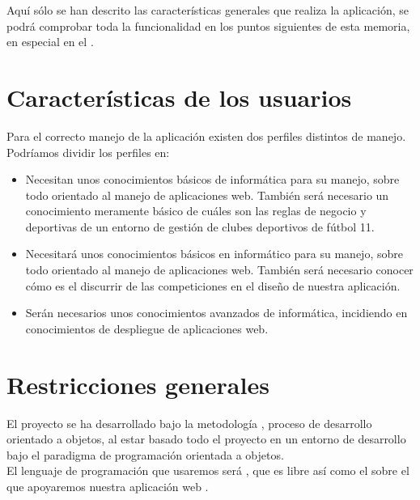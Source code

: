 Aquí sólo se han descrito las características generales que realiza la
aplicación, se podrá comprobar toda la funcionalidad en los puntos siguientes de
esta memoria, en especial en el .

\section{Características de los usuarios}

Para el correcto manejo de la aplicación  existen dos perfiles distintos de manejo.\\

Podríamos dividir los perfiles en:

\begin{itemize}
\item {} Necesitan unos conocimientos básicos de
  informática para su manejo, sobre todo orientado al manejo de aplicaciones
  web. También será necesario un conocimiento meramente básico de cuáles son las
  reglas de negocio y deportivas de un entorno de gestión de clubes deportivos
  de fútbol 11.
\item {} Necesitará unos conocimientos básicos
  en informático para su manejo, sobre todo orientado al manejo de aplicaciones
  web. También será necesario conocer cómo es el discurrir de las competiciones
  en el diseño de nuestra aplicación.
\item {} Serán necesarios unos
  conocimientos avanzados de informática, incidiendo en conocimientos de
  despliegue de aplicaciones web.
\end{itemize}

\section{Restricciones generales}
El proyecto se ha desarrollado bajo la metodología , proceso de desarrollo orientado a objetos, al estar basado
todo el proyecto en un entorno de desarrollo bajo el paradigma
de programación orientada a objetos.\\

El lenguaje de programación que usaremos será , que es libre así
como el  sobre el que apoyaremos nuestra
aplicación web .\\

